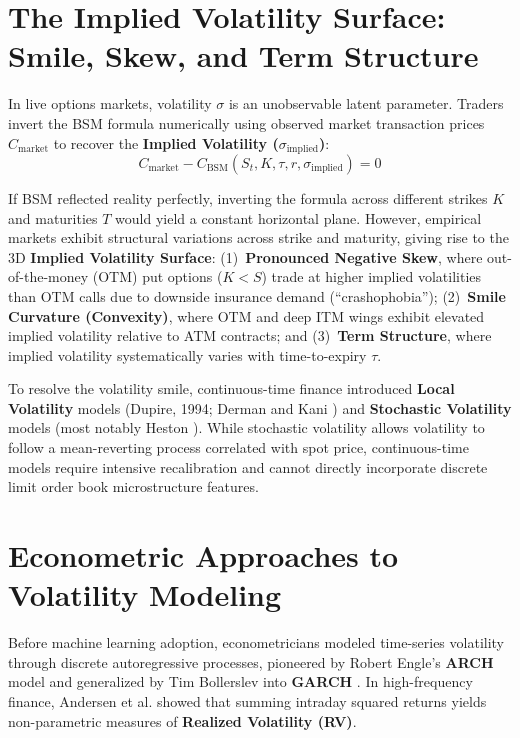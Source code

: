 \section{The Implied Volatility Surface: Smile, Skew, and Term Structure}
\label{sec:iv_surface_dynamics}

In live options markets, volatility $\sigma$ is an unobservable latent parameter. Traders invert the BSM formula numerically using observed market transaction prices $C_{\text{market}}$ to recover the \textbf{Implied Volatility ($\sigma_{\text{implied}}$)}:
\begin{equation}
    C_{\text{market}} - C_{\text{BSM}}(S_t, K, \tau, r, \sigma_{\text{implied}}) = 0
\end{equation}

If BSM reflected reality perfectly, inverting the formula across different strikes $K$ and maturities $T$ would yield a constant horizontal plane. However, empirical markets exhibit structural variations across strike and maturity, giving rise to the 3D \textbf{Implied Volatility Surface}: (1)~\textbf{Pronounced Negative Skew}, where out-of-the-money (OTM) put options ($K < S$) trade at higher implied volatilities than OTM calls due to downside insurance demand (``crashophobia''); (2)~\textbf{Smile Curvature (Convexity)}, where OTM and deep ITM wings exhibit elevated implied volatility relative to ATM contracts; and (3)~\textbf{Term Structure}, where implied volatility systematically varies with time-to-expiry $\tau$.

To resolve the volatility smile, continuous-time finance introduced \textbf{Local Volatility} models (Dupire, 1994; Derman and Kani \cite{derman1994riding}) and \textbf{Stochastic Volatility} models (most notably Heston \cite{heston1993closed}). While stochastic volatility allows volatility to follow a mean-reverting process correlated with spot price, continuous-time models require intensive recalibration and cannot directly incorporate discrete limit order book microstructure features.

\section{Econometric Approaches to Volatility Modeling}
\label{sec:econometric_approaches}

Before machine learning adoption, econometricians modeled time-series volatility through discrete autoregressive processes, pioneered by Robert Engle's \textbf{ARCH} model \cite{engle1982autoregressive} and generalized by Tim Bollerslev into \textbf{GARCH} \cite{bollerslev1986generalized}. In high-frequency finance, Andersen et al. \cite{andersen2003modeling} showed that summing intraday squared returns yields non-parametric measures of \textbf{Realized Volatility (RV)}.

